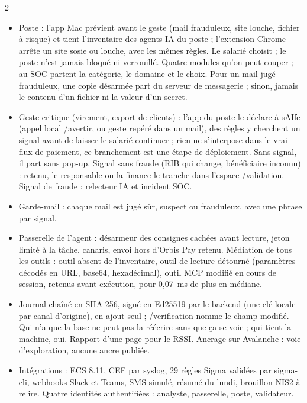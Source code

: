 \documentclass[7.6pt]{extarticle}
\newcommand{\h}[1]{\vspace{2pt}{\bfseries\color{accent}\small #1}\par\vspace{0.3pt}}
\newcommand{\cmd}[1]{{\ttfamily #1}}
\begin{document}
\raggedcolumns
\begin{multicols}{2}
\h{Les contrôles}
\begin{itemize}
\item Poste : l’app Mac prévient avant le geste (mail frauduleux, site louche, fichier à risque) et tient l’inventaire des agents IA du poste ; l’extension Chrome arrête un site sosie ou louche, avec les mêmes règles. Le salarié choisit ; le poste n’est jamais bloqué ni verrouillé. Quatre modules qu’on peut couper ; au SOC partent la catégorie, le domaine et le choix. Pour un mail jugé frauduleux, une copie désarmée part du serveur de messagerie ; sinon, jamais le contenu d’un fichier ni la valeur d’un secret.
\item Geste critique (virement, export de clients) : l’app du poste le déclare à sAIfe (appel local \cmd{/avertir}, ou geste repéré dans un mail), des règles y cherchent un signal avant de laisser le salarié continuer ; rien ne s’interpose dans le vrai flux de paiement, ce branchement est une étape de déploiement. Sans signal, il part sans pop-up. Signal sans fraude (RIB qui change, bénéficiaire inconnu) : retenu, le responsable ou la finance le tranche dans l’espace \cmd{/validation}. Signal de fraude : relecteur IA et incident SOC.
\item Garde-mail : chaque mail est jugé sûr, suspect ou frauduleux, avec une phrase par signal.
\item Passerelle de l’agent : désarmeur des consignes cachées avant lecture, jeton limité à la tâche, canaris, envoi hors d’Orbis Pay retenu. Médiation de tous les outils : outil absent de l’inventaire, outil de lecture détourné (paramètres décodés en URL, base64, hexadécimal), outil MCP modifié en cours de session, retenus avant exécution, pour 0,07~ms de plus en médiane.
\item Journal chaîné en SHA-256, signé en Ed25519 par le backend (une clé locale par canal d’origine), en ajout seul ; \cmd{/verification} nomme le champ modifié. Qui n’a que la base ne peut pas la réécrire sans que ça se voie ; qui tient la machine, oui. Rapport d’une page pour le RSSI. Ancrage sur Avalanche : voie d’exploration, aucune ancre publiée.
\item Intégrations : ECS 8.11, CEF par syslog, 29 règles Sigma validées par sigma-cli, webhooks Slack et Teams, SMS simulé, résumé du lundi, brouillon NIS2 à relire. Quatre identités authentifiées : analyste, passerelle, poste, validateur.
\end{itemize}


\end{multicols}
\end{document}
